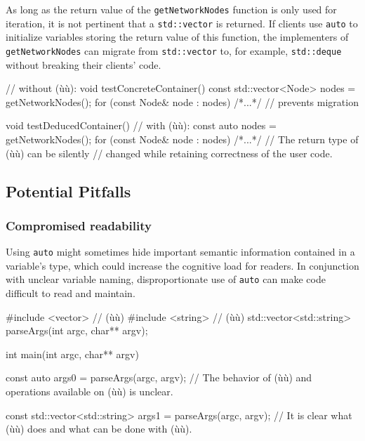 \noindent As long as the return value of the \lstinline!getNetworkNodes! function is
only used for iteration, it is not pertinent that a \lstinline!std::vector! is
returned. If clients use \lstinline!auto! to initialize
variables storing the return value of this function, the implementers of
\lstinline!getNetworkNodes! can migrate from \lstinline!std::vector! to,
for example, \lstinline!std::deque! without breaking their clients'
code.

\begin{emcppslisting}[emcppsbatch=e11]
// without (ù{}ù):
void testConcreteContainer()
{
    const std::vector<Node> nodes = getNetworkNodes();
    for (const Node& node : nodes) { /*...*/ }
        // prevents migration
}

void testDeducedContainer()
{
    // with (ù{}ù):
    const auto nodes = getNetworkNodes();
    for (const Node& node : nodes) { /*...*/ }
        // The return type of (ù{}ù) can be silently
        // changed while retaining correctness of the user code.
}
\end{emcppslisting}


\subsection[Potential Pitfalls]{Potential Pitfalls}\label{potential-pitfalls-auto}

\subsubsection[Compromised readability]{Compromised readability}\label{compromised-readability}

Using \lstinline!auto! might sometimes hide important semantic information contained in a
variable's type, which could increase the cognitive load for readers. In conjunction
with unclear variable naming, disproportionate use of \lstinline!auto! can
make code difficult to read and maintain.

\begin{emcppshiddenlisting}[emcppsbatch=e12]
#include <vector>  // (ù{}ù)
#include <string>  // (ù{}ù)
std::vector<std::string> parseArgs(int argc, char** argv);
\end{emcppshiddenlisting}
\begin{emcppslisting}[emcppsbatch=e12]
int main(int argc, char** argv)
{
    const auto args0 = parseArgs(argc, argv);
        // The behavior of (ù{}ù) and operations available on (ù{}ù) is unclear.

    const std::vector<std::string> args1 = parseArgs(argc, argv);
        // It is clear what (ù{}ù) does and what can be done with (ù{}ù).
}
\end{emcppslisting}

